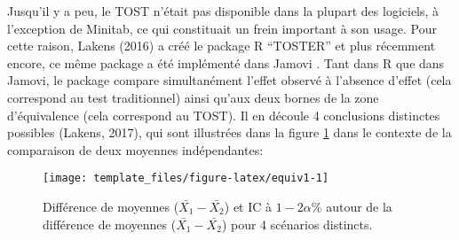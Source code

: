 \documentclass[
  12pt,
  french,
]{article}
\begin{document}
Jusqu'il y a peu, le TOST n'était pas disponible dans la plupart des
logiciels, à l'exception de Minitab, ce qui constituait un frein
important à son usage. Pour cette raison, Lakens (2016) a créé le
package R ``TOSTER'' et plus récemment encore, ce même package a été
implémenté dans Jamovi
.
Tant dans R que dans Jamovi, le package compare simultanément l'effet
observé à l'absence d'effet (cela correspond au test traditionnel) ainsi
qu'aux deux bornes de la zone d'équivalence (cela correspond au TOST).
Il en découle 4 conclusions distinctes possibles (Lakens, 2017), qui
sont illustrées dans la figure \ref{fig:equiv1} dans le contexte de la
comparaison de deux moyennes indépendantes:

\begin{figure}

{\centering \texttt{[image: template\_files/figure-latex/equiv1-1]} 

}

\caption{Différence de moyennes ($\bar{X_1}-\bar{X_2}$) et IC à $1-2\alpha\%$ autour de la différence de moyennes ($\bar{X_1}-\bar{X_2}$) pour 4 scénarios distincts.}\label{fig:equiv1}
\end{figure}
\end{document}
